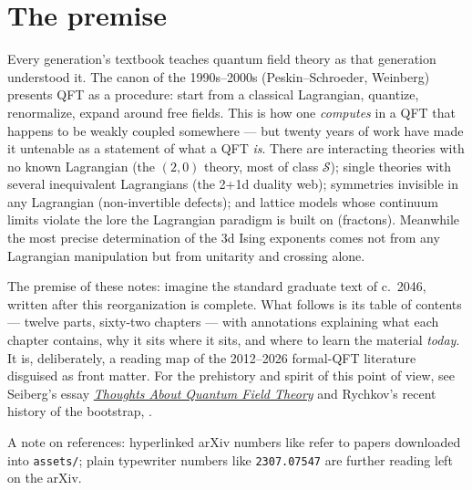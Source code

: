 
{}
\section*{The premise}

Every generation's textbook teaches quantum field theory as that generation understood it. The canon of the 1990s--2000s (Peskin--Schroeder, Weinberg) presents QFT as a procedure: start from a classical Lagrangian, quantize, renormalize, expand around free fields. This is how one \emph{computes} in a QFT that happens to be weakly coupled somewhere --- but twenty years of work have made it untenable as a statement of what a QFT \emph{is}. There are interacting theories with no known Lagrangian (the $(2,0)$ theory, most of class $\mathcal{S}$); single theories with several inequivalent Lagrangians (the 2+1d duality web); symmetries invisible in any Lagrangian (non-invertible defects); and lattice models whose continuum limits violate the lore the Lagrangian paradigm is built on (fractons). Meanwhile the most precise determination of the 3d Ising exponents comes not from any Lagrangian manipulation but from unitarity and crossing alone.

\noin The premise of these notes: imagine the standard graduate text of c.~2046, written after this reorganization is complete. What follows is its table of contents --- twelve parts, sixty-two chapters --- with annotations explaining what each chapter contains, why it sits where it sits, and where to learn the material \emph{today}. It is, deliberately, a reading map of the 2012--2026 formal-QFT literature disguised as front matter. For the prehistory and spirit of this point of view, see Seiberg's essay \href{https://www.ias.edu/sites/default/files/sns/files/QFT.pdf}{\emph{Thoughts About Quantum Field Theory}} and Rychkov's recent history of the bootstrap, .

\noin A note on references: hyperlinked arXiv numbers like  refer to papers downloaded into \texttt{assets/}; plain typewriter numbers like \texttt{2307.07547} are further reading left on the arXiv.

